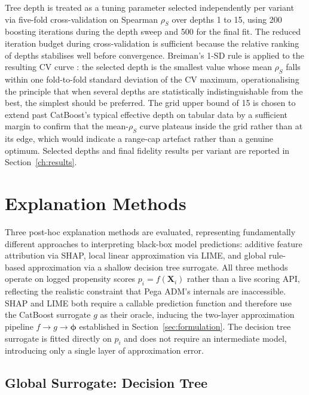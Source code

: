 \documentclass[oneside]{memoir} %
\begin{document}
Tree depth is treated as a tuning parameter selected independently per variant via five-fold cross-validation on Spearman $\rho_S$ over depths 1 to 15, using 200 boosting iterations during the depth sweep and 500 for the final fit. The reduced iteration budget during cross-validation is sufficient because the relative ranking of depths stabilises well before convergence. Breiman's 1-SD rule is applied to the resulting CV curve
\parencite{hastie_elements_2009}: the selected depth is the smallest value whose mean $\rho_S$
falls within one fold-to-fold standard deviation of the CV maximum, operationalising the principle that when several depths are statistically indistinguishable from the best, the simplest should be preferred. The grid upper bound of 15 is chosen to extend past CatBoost's typical effective depth on tabular data by a sufficient margin to confirm that the mean-$\rho_S$ curve plateaus inside the grid rather than at its edge, which would indicate a range-cap artefact rather than a genuine optimum. Selected depths and final fidelity results per variant are reported in Section~\ref{ch:results}.

\section{Explanation Methods} \label{sec:explanation_methods}

Three post-hoc explanation methods are evaluated, representing fundamentally different approaches to interpreting black-box model predictions: additive feature attribution via SHAP, local linear approximation via LIME, and global rule-based approximation via a shallow decision tree surrogate. All three methods operate on logged propensity scores $p_i = f(\mathbf{X}_i)$ rather than a live scoring API, reflecting the realistic constraint that Pega ADM's internals are inaccessible. SHAP and LIME both require a callable prediction function and therefore use the CatBoost surrogate $g$ as their oracle, inducing the two-layer approximation pipeline $f \rightarrow g \rightarrow \boldsymbol{\phi}$ established in Section~\ref{sec:formulation}. The decision tree surrogate is fitted directly on $p_i$ and does not require an intermediate model, introducing only a single layer of approximation error.

\subsection{Global Surrogate: Decision Tree}
\end{document}
